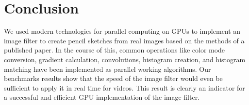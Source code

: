 \section{Conclusion}
We used modern technologies for parallel computing on GPUs to implement
an image filter to create pencil sketches from real images based on the
methods of a published paper.
In the course of this, common operations like color mode conversion,
gradient calculation, convolutions, histogram creation, and histogram
matching have been implemented as parallel working algorithms.
Our benchmarks results show that the speed of the image filter would even
be sufficient to apply it in real time for videos. This result is clearly an
indicator for a successful and efficient GPU implementation of the image
filter.

